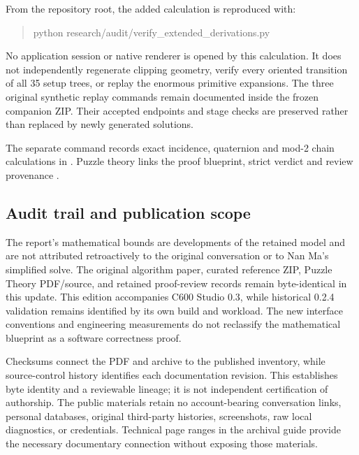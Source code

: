 \documentclass[a4paper,11pt]{article}
\begin{document}
\begin{samepage}
From the repository root, the added calculation is reproduced with:
\begin{quote}\small\ttfamily
python research/audit/verify\_extended\_derivations.py
\end{quote}
\end{samepage}
No application session or native renderer is opened by this calculation. It does not independently regenerate clipping geometry, verify every oriented transition of all 35 setup trees, or replay the enormous primitive expansions. The three original synthetic replay commands remain documented inside the frozen companion ZIP. Their accepted endpoints and stage checks are preserved rather than replaced by newly generated solutions.

The separate command  records exact incidence, quaternion and mod-2 chain calculations in . Puzzle theory links the proof blueprint, strict verdict and review provenance \cite{puzzletheory}.

\subsection{Audit trail and publication scope}

The report's mathematical bounds are developments of the retained model and are not attributed retroactively to the original conversation or to Nan Ma's simplified solve. The original algorithm paper, curated reference ZIP, Puzzle Theory PDF/source, and retained proof-review records remain byte-identical in this update. This edition accompanies C600 Studio 0.3, while historical 0.2.4 validation remains identified by its own build and workload. The new interface conventions and engineering measurements do not reclassify the mathematical blueprint as a software correctness proof.

Checksums connect the PDF and archive to the published inventory, while source-control history identifies each documentation revision. This establishes byte identity and a reviewable lineage; it is not independent certification of authorship. The public materials retain no account-bearing conversation links, personal databases, original third-party histories, screenshots, raw local diagnostics, or credentials. Technical page ranges in the archival guide provide the necessary documentary connection without exposing those materials.
\end{document}

